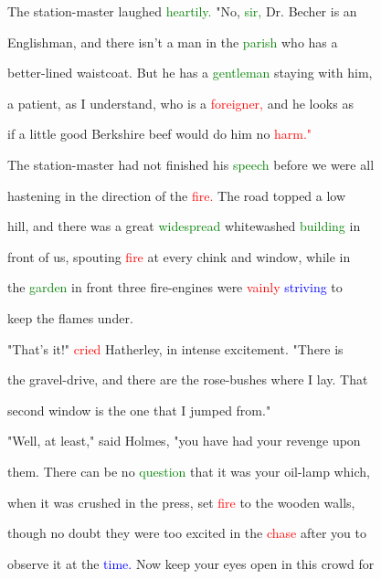  The station-master \textcolor{BurntOrange}{laughed} \textcolor{green}{heartily.} "No, \textcolor{green}{sir,} Dr. Becher is an

 Englishman, and there isn't a man in the \textcolor{green}{parish} who has a

 better-lined waistcoat. But he has a \textcolor{green}{gentleman} staying with him,

 a \textcolor{BurntOrange}{patient,} as I understand, who is a \textcolor{red}{foreigner,} and he looks as

 if a little \textcolor{BurntOrange}{good} Berkshire beef would do him no \textcolor{red}{harm."}



 The station-master had not finished his \textcolor{green}{speech} before we were all

 hastening in the direction of the \textcolor{red}{fire.} The road topped a low

 hill, and there was a great \textcolor{green}{widespread} whitewashed \textcolor{green}{building} in

 front of us, spouting \textcolor{red}{fire} at every chink and window, while in

 the \textcolor{green}{garden} in front three fire-engines were \textcolor{red}{vainly} \textcolor{blue}{striving} to

 keep the flames under.



 "That's it!" \textcolor{red}{cried} Hatherley, in \textcolor{BurntOrange}{intense} \textcolor{BurntOrange}{excitement.} "There is

 the gravel-drive, and there are the rose-bushes where I lay. That

 second window is the one that I jumped from."



 "Well, at least," said Holmes, "you have had your \textcolor{BurntOrange}{revenge} upon

 them. There can be no \textcolor{green}{question} that it was your oil-lamp which,

 when it was crushed in the press, set \textcolor{red}{fire} to the wooden walls,

 though no \textcolor{BurntOrange}{doubt} they were too \textcolor{BurntOrange}{excited} in the \textcolor{red}{chase} after you to

 observe it at the \textcolor{blue}{time.} Now keep your eyes open in this crowd for

